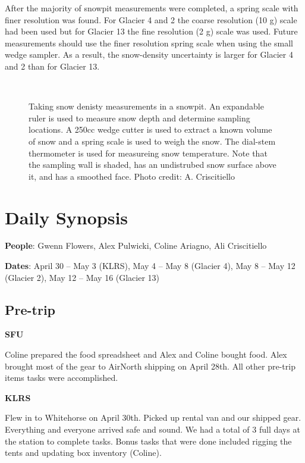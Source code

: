 \documentclass[12pt]{article}
\begin{document}
After the majority of snowpit measurements were completed, a spring scale with finer resolution was found. For Glacier 4 and 2 the coarse resolution (10 g) scale had been used but for Glacier 13 the fine resolution (2 g) scale was used. Future measurements should use the finer resolution spring scale when using the small wedge sampler. As a result, the snow-density uncertainty is larger for Glacier 4 and 2 than for Glacier 13. 

\begin{figure}
	\centering
	\\
	\caption{Taking snow denisty measurements in a snowpit. An expandable ruler is used to measure snow depth and determine sampling locations. A 250cc wedge cutter is used to extract a known volume of snow and a spring scale is used to weigh the snow. The dial-stem thermometer is used for measureing snow temperature. Note that the sampling wall is shaded, has an undistrubed snow surface above it, and has a smoothed face. Photo credit: A. Criscitiello}
	\label{photo_snowpit}
	\end{figure}
	
\section{Daily Synopsis}

\textbf{People}: Gwenn Flowers, Alex Pulwicki, Coline Ariagno, Ali Criscitiello

\noindent \textbf{Dates}: April 30 -- May 3 (KLRS), May 4 -- May 8 (Glacier 4), May 8 -- May 12 (Glacier 2), May 12 -- May 16 (Glacier 13)

\subsection{Pre-trip}

\textbf{SFU}

Coline prepared the food spreadsheet and Alex and Coline bought food. Alex brought most of the gear to AirNorth shipping on April 28th. All other pre-trip items tasks were accomplished. 

\noindent \textbf{KLRS}

Flew in to Whitehorse on April 30th. Picked up rental van and our shipped gear. Everything and everyone arrived safe and sound. We had a total of 3 full days at the station to complete tasks. Bonus tasks that were done included rigging the tents and updating box inventory (Coline).
\end{document}
